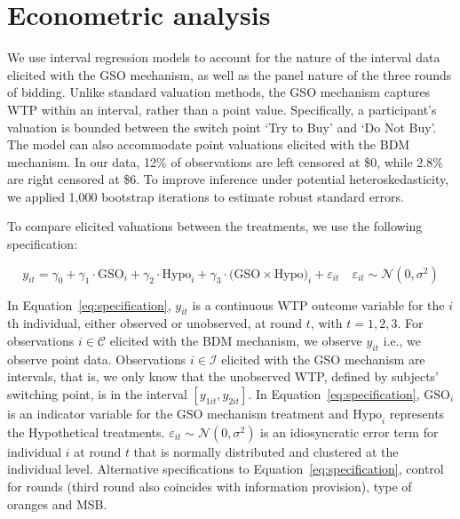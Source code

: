 \documentclass[12pt]{article}
\begin{document}


\section{Econometric analysis}
\label{Econometric}
We use interval regression models to account for the nature of the interval data elicited with the GSO mechanism, as well as the panel nature of the three rounds of bidding. Unlike standard valuation methods, the GSO mechanism captures WTP within an interval, rather than a point value. Specifically, a participant's valuation is bounded between the switch point `Try to Buy' and `Do Not Buy'. The model can also accommodate point valuations elicited with the BDM mechanism. In our data, 12\% of observations are left censored at \$0, while 2.8\% are right censored at \$6. To improve inference under potential heteroskedasticity, we applied 1,000 bootstrap iterations to estimate robust standard errors.

To compare elicited valuations between the treatments, we use the following specification:
\vspace{-1cm}

\begin{equation}\label{eq:specification}
y_{it} = \gamma_0 + \gamma_1 \cdot \text{GSO}_i + \gamma_2 \cdot \text{Hypo}_i + \gamma_3 \cdot \text{(GSO} \times \text{Hypo)}_i +  \varepsilon_{it} 
\quad \varepsilon_{it} \sim \mathcal{N}(0, \sigma^2)
\end{equation}


In Equation~\ref{eq:specification}, $y_{it}$ is a continuous WTP outcome variable for the $i$th individual, either observed or unobserved, at round $t$, with $t = 1, 2, 3$. For observations $i \in \mathcal{C}$ elicited with the BDM mechanism, we observe $y_{it}$ i.e., we observe point data. Observations $i\in \mathcal{I}$ elicited with the GSO mechanism are intervals, that is, we only know that the unobserved WTP, defined by subjects' switching point, is in the interval $[y_{1it}, y_{2it}]$. In Equation~\ref{eq:specification}, $\text{GSO}_i$ is an indicator variable for the GSO mechanism treatment and $\text{Hypo}_i$ represents the Hypothetical treatments. $\varepsilon_{it} \sim \mathcal{N}(0, \sigma^2)$ is an idiosyncratic error term for individual $i$ at round $t$ that is normally distributed and clustered at the individual level.
Alternative specifications to Equation~\ref{eq:specification}, control for rounds (third round also coincides with information provision), type of oranges and MSB.
\end{document}
